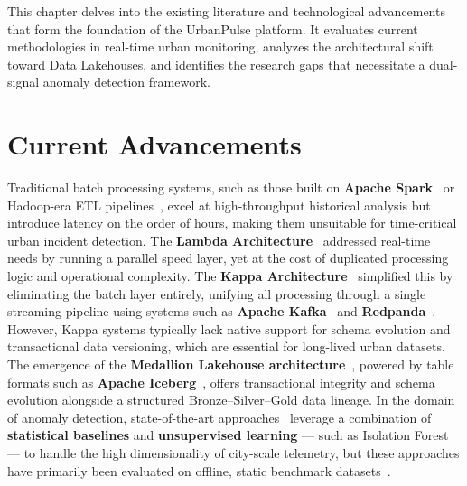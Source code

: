 This chapter delves into the existing literature and technological advancements that form the foundation of the UrbanPulse platform. It evaluates current methodologies in real-time urban monitoring, analyzes the architectural shift toward Data Lakehouses, and identifies the research gaps that necessitate a dual-signal anomaly detection framework.
\section{Current Advancements}
Traditional batch processing systems, such as those built on \textbf{Apache Spark}~\cite{spark_streaming} or Hadoop-era ETL pipelines~\cite{kleppmann_ddia}, excel at high-throughput historical analysis but introduce latency on the order of hours, making them unsuitable for time-critical urban incident detection. The \textbf{Lambda Architecture}~\cite{kleppmann_ddia} addressed real-time needs by running a parallel speed layer, yet at the cost of duplicated processing logic and operational complexity. The \textbf{Kappa Architecture}~\cite{kafka-definitive-guide} simplified this by eliminating the batch layer entirely, unifying all processing through a single streaming pipeline using systems such as \textbf{Apache Kafka}~\cite{kafka-definitive-guide} and \textbf{Redpanda}~\cite{redpanda-streaming}. However, Kappa systems typically lack native support for schema evolution and transactional data versioning, which are essential for long-lived urban datasets. The emergence of the \textbf{Medallion Lakehouse architecture}~\cite{databricks_lakehouse}, powered by table formats such as \textbf{Apache Iceberg}~\cite{iceberg-table-format}, offers transactional integrity and schema evolution alongside a structured Bronze–Silver–Gold data lineage. In the domain of anomaly detection, state-of-the-art approaches~\cite{chandola2009anomaly} leverage a combination of \textbf{statistical baselines} and \textbf{unsupervised learning} — such as Isolation Forest~\cite{isolation-forest} — to handle the high dimensionality of city-scale telemetry, but these approaches have primarily been evaluated on offline, static benchmark datasets~\cite{chandola2009anomaly}.
